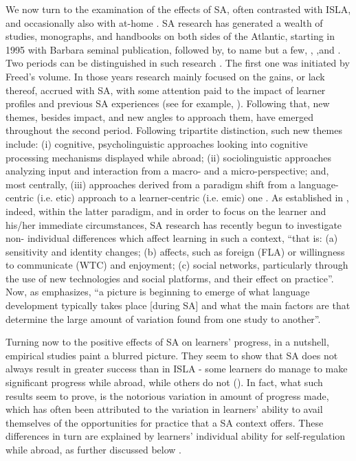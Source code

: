 \documentclass[output=paper]{langsci/langscibook}
\begin{document}
We now turn to the examination of the effects of SA, often contrasted with ISLA, and occasionally also with at-home . SA research has generated a wealth of studies,  monographs, and handbooks on both sides of the Atlantic, starting in 1995 with Barbara  seminal publication, followed by, to name but a few, \citet{CollentineFreed2004intro,Pellegrino2005,DuFonChurchill2006}, \citet{DeKeyser2007,Collentine2009,Kinginger2009,Jackson2013,LlanesMuñoz2013,ReganEtAl2009,MitchellEtAl2015,Pérez-Vidal2014a,Pérez-Vidal2017},and \citet{SanzMorales2018}. Two periods can be distinguished in such research \citep{Collentine2009,Pérez-Vidal2014b}. The first one was initiated by Freed’s volume. In those years research mainly focused on the  gains, or lack thereof, accrued with SA, with some attention paid to the impact of learner profiles and previous SA experiences (see for example, \citealt{BrechtEtAl1995}). Following that, new themes, besides  impact, and new angles to approach them, have emerged throughout the second period. Following  tripartite distinction, such new themes include: (i) cognitive, psycholinguistic approaches looking into cognitive processing mechanisms displayed while abroad; (ii) sociolinguistic approaches analyzing input and interaction from a macro- and a micro-perspective; and, most centrally, (iii)  approaches derived from a paradigm shift from a language-centric (i.e. etic) approach to a learner-centric (i.e. emic) one \citep{Devlin2014studyabroad}. As established in \citet[341]{Pérez-Vidal2017}, indeed, within the latter paradigm, and in order to focus on the learner and his/her immediate circumstances, SA research has recently begun to investigate non- individual differences which affect learning in such a context, “that is: (a)  sensitivity and identity changes; (b) affects, such as foreign  (FLA) or willingness to communicate (WTC) and enjoyment; (c) social networks, particularly through the use of new technologies and social platforms, and their effect on  practice”. Now, as \citet[313]{DeKeyser2014} emphasizes, “a picture is beginning to emerge of what language development typically takes place [during SA] and what the main factors are that determine the large amount of variation found from one study to another”. 


Turning now to the positive effects of SA on learners’  progress, in a nutshell, empirical studies paint a blurred picture. They seem to show that SA does not always result in greater success than  in ISLA -  some learners do manage to make significant  progress while abroad, while others do not (\citealt{DeKeyser2007,Collentine2009,Llanes2011,Pérez-Vidal2015b,Sanz2014}). In fact, what such results seem to prove, is the notorious variation in amount of progress made, which has often been attributed to the variation in learners’ ability to avail themselves of the opportunities for practice that a SA context offers. These differences in turn are explained by learners’ individual ability for self-regulation while abroad, as further discussed below \citet{UshiodaDörnyei2012}. 
\end{document}
